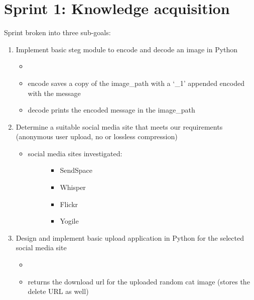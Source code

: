 \documentclass[letterpaper,10pt,english]{sphinxmanual}
\begin{document}
\section{Sprint 1: Knowledge acquisition}
\label{index:sprint-1-knowledge-acquisition}
Sprint broken into three sub-goals:
\begin{enumerate}
\item {} 
Implement basic steg module to encode and decode an image in Python
\begin{itemize}
\item {} 

\item {} 
encode saves a copy of the image\_path with a `\_1' appended encoded with the message

\item {} 
decode prints the encoded message in the image\_path

\end{itemize}

\item {} 
Determine a suitable social media site that meets our requirements (anonymous user upload, no or lossless compression)
\begin{itemize}
\item {} \begin{description}
\item[{social media sites investigated:}] \leavevmode\begin{itemize}
\item {} 
SendSpace

\item {} 
Whisper

\item {} 
Flickr

\item {} 
Yogile

\end{itemize}

\end{description}

\end{itemize}

\item {} 
Design and implement basic upload application in Python for the selected social media site
\begin{itemize}
\item {} 

\item {} 
returns the download url for the uploaded random cat image (stores the delete URL as well)

\end{itemize}

\end{enumerate}
\end{document}
